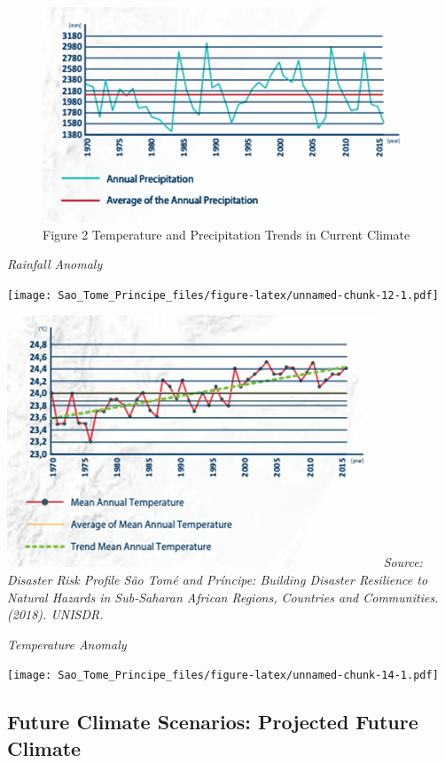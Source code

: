 \documentclass[
]{book}
\begin{document}
\begin{figure}
\centering
\includegraphics{images/pr_trends.png}
\caption{Figure 2 Temperature and Precipitation Trends in Current Climate}
\end{figure}

\emph{Rainfall Anomaly}

\texttt{[image: Sao\_Tome\_Principe\_files/figure-latex/unnamed-chunk-12-1.pdf]}

\includegraphics{images/temp_trends.png}
\emph{Source: Disaster Risk Profile São Tomé and Príncipe: Building Disaster Resilience to Natural Hazards in Sub-Saharan African Regions, Countries and Communities. (2018). UNISDR.}

\emph{Temperature Anomaly}

\texttt{[image: Sao\_Tome\_Principe\_files/figure-latex/unnamed-chunk-14-1.pdf]}

\hypertarget{future-climate-scenarios-projected-future-climate}{%
\subsection{Future Climate Scenarios: Projected Future Climate}\label{future-climate-scenarios-projected-future-climate}}
\end{document}
